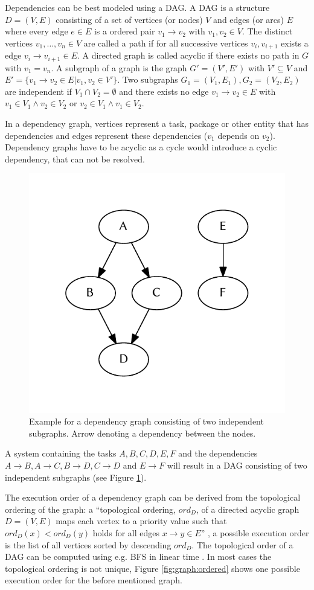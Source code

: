 		Dependencies can be best modeled using a \ac{DAG}. A \ac{DAG} is a structure $D=(V, E)$ consisting of a set of vertices (or nodes) $V$ and edges (or arcs) $E$ where every edge $e\in E$ is a ordered pair $v_1 \rightarrow v_2$ with $v_1, v_2 \in V$. The distinct vertices $v_1,\dots,v_n\in V$ are called a path if for all successive vertices $v_i, v_{i+1}$ exists a edge $v_i \rightarrow v_{i+1} \in E$. A directed graph is called acyclic if there exists no path in $G$ with $v_1 = v_n$. A subgraph of a graph is the graph $G' = (V', E')$ with $V'\subseteq V$ and $E' = \{v_1 \rightarrow v_2 \in E | v_1, v_2\in V'\}$. Two subgraphs $G_1 = (V_1, E_1), G_2 = (V_2, E_2)$ are independent if $V_1 \cap V_2 = \emptyset$ and there exists no edge $v_1\rightarrow v_2\in E$ with $v_1\in V_1 \wedge v_2\in V_2$ or $v_2\in V_1 \wedge v_1\in V_2$.

		In a dependency graph, vertices represent a task, package or other entity that has dependencies and edges represent these dependencies ($v_1$ depends on $v_2$). Dependency graphs have to be acyclic as a cycle would introduce a cyclic dependency, that can not be resolved.

		\begin{figure}[!htb]
			\centering
			\includegraphics[width=.4474\textwidth]{figures/unordered-graph.pdf} %
			\caption{\label{fig:graph:unordered} Example for a dependency graph consisting of two independent subgraphs. Arrow denoting a dependency between the nodes.}
		\end{figure}

		A system containing the tasks $A, B, C, D, E, F$ and the dependencies $A\rightarrow B, A\rightarrow C, B\rightarrow D, C\rightarrow D$ and $E\rightarrow F$ will result in a \ac{DAG} consisting of two independent subgraphs (see Figure \ref{fig:graph:unordered}).

		The execution order of a dependency graph can be derived from the topological ordering of the graph: a ``topological ordering, $ord_D$, of a directed acyclic graph $D = (V, E)$ maps each vertex to a priority value such that $ord_{D}(x) < ord_{D}(y)$ holds for all edges $x \rightarrow y \in E$'' \citep{pearce2007dynamic}, a possible execution order is the list of all vertices sorted by descending $ord_D$. The topological order of a \ac{DAG} can be computed using e.g. \ac{BFS} in linear time \citep{cormen2001introduction}. In most cases the topological ordering is not unique, Figure \ref{fig:graph:ordered} shows one possible execution order for the before mentioned graph.

